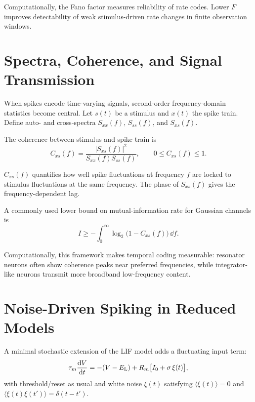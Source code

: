 Computationally, the Fano factor measures reliability of rate codes. Lower $F$ improves detectability of weak stimulus-driven rate changes in finite observation windows.

\section{Spectra, Coherence, and Signal Transmission}
\label{sec:spectra-coherence}

When spikes encode time-varying signals, second-order frequency-domain statistics become central. Let $s(t)$ be a stimulus and $x(t)$ the spike train. Define auto- and cross-spectra $S_{xx}(f)$, $S_{ss}(f)$, and $S_{xs}(f)$.

The coherence between stimulus and spike train is
%
\begin{equation}
  C_{xs}(f) = \frac{|S_{xs}(f)|^2}{S_{xx}(f)S_{ss}(f)},
  \qquad 0 \le C_{xs}(f) \le 1.
  \label{eq:coherence}
\end{equation}
%

$C_{xs}(f)$ quantifies how well spike fluctuations at frequency $f$ are locked to stimulus fluctuations at the same frequency. The phase of $S_{xs}(f)$ gives the frequency-dependent lag.

A commonly used lower bound on mutual-information rate for Gaussian channels is
%
\begin{equation}
  I \ge -\int_0^{\infty} \log_2\!\bigl(1-C_{xs}(f)\bigr)\,\dd f.
  \label{eq:info-coherence}
\end{equation}
%

Computationally, this framework makes temporal coding measurable: resonator neurons often show coherence peaks near preferred frequencies, while integrator-like neurons transmit more broadband low-frequency content.

\section{Noise-Driven Spiking in Reduced Models}
\label{sec:noise-driven-lif}

A minimal stochastic extension of the LIF model adds a fluctuating input term:
%
\begin{equation}
  \tau_m \frac{\mathop{}\!\mathrm{d} V}{\mathop{}\!\mathrm{d} t} = -(V-E_{\mathrm{L}}) + R_m\bigl[I_0 + \sigma\,\xi(t)\bigr],
  \label{eq:stoch-lif}
\end{equation}
%
with threshold/reset as usual and white noise $\xi(t)$ satisfying
$\langle \xi(t) \rangle=0$ and
$\langle \xi(t)\xi(t') \rangle=\delta(t-t')$.

